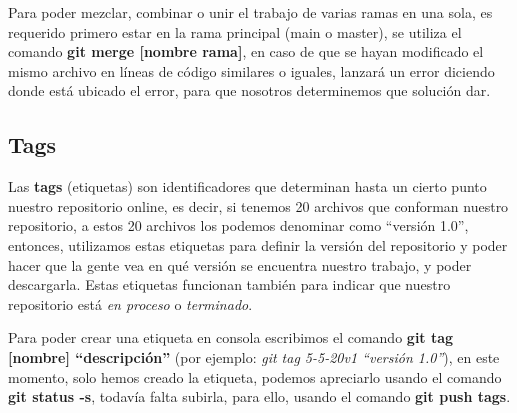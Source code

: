 Para poder mezclar, combinar o unir el trabajo de varias ramas en una sola, es requerido primero estar en la rama principal (main o master), se utiliza el comando \textbf{git merge [nombre rama]}, en caso de que se hayan modificado el mismo archivo en líneas de código similares o iguales, lanzará un error diciendo donde está ubicado el error, para que nosotros determinemos que solución dar.



\subsection{Tags}
\hspace{0.55cm}Las \textbf{tags} (etiquetas) son identificadores que determinan hasta un cierto punto nuestro repositorio online, es decir, si tenemos 20 archivos que conforman nuestro repositorio, a estos 20 archivos los podemos denominar como “versión 1.0”, entonces, utilizamos estas etiquetas para definir la versión del repositorio y poder hacer que la gente vea en qué versión se encuentra nuestro trabajo, y poder descargarla. Estas etiquetas funcionan también para indicar que nuestro repositorio está \textit{en proceso} o \textit{terminado}.

Para poder crear una etiqueta en consola escribimos el comando \textbf{git tag [nombre] “descripción”} (por ejemplo: \textit{git tag 5-5-20v1 “versión 1.0”}), en este momento, solo hemos creado la etiqueta, podemos apreciarlo usando el comando \textbf{git status -s}, todavía falta subirla, para ello, usando el comando \textbf{git push tags}.





